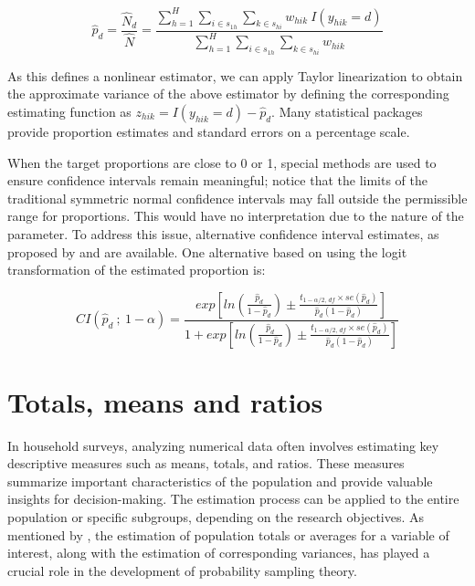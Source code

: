 \documentclass[
  12pt,
]{book}
\begin{document}
\[
\widehat{p}_d = \frac{\widehat{N}_d}{\widehat{N}} = \frac{\sum_{h=1}^{H}\sum_{i \in s_{1h}} \sum_{ k \in s_{hi}} w_{hik}\ I(y_{hik} = d)} {\sum_{h=1}^{H}\sum_{i \in s_{1h}} \sum_{ k \in s_{hi}} w_{hik}}
\]

As this defines a nonlinear estimator, we can apply Taylor linearization to obtain the approximate variance of the above estimator by defining the corresponding estimating function as \(z_{hik} = I(y_{hik} = d) - \widehat{p}_d\). Many statistical packages provide proportion estimates and standard errors on a percentage scale.

When the target proportions are close to 0 or 1, special methods are used to ensure confidence intervals remain meaningful; notice that the limits of the traditional symmetric normal confidence intervals may fall outside the permissible range for proportions. This would have no interpretation due to the nature of the parameter. To address this issue, alternative confidence interval estimates, as proposed by \citet{Rust2007ConfidenceIF} and \citet{DeanPagano2015} are available. One alternative based on using the logit transformation of the estimated proportion is:

\[
CI \left( \widehat{p}_d \ ; \ 1 - \alpha \right) = \frac {exp \left[ ln \left( \frac{\widehat{p}_d} {1 - \widehat{p}_d} \right) \pm \frac{t_{1-\alpha/2 , \, df} \times se \left( \widehat{p}_d \right)} {\widehat{p}_d \left( 1 - \widehat{p}_d \right) } \right]} {1 + exp \left[ ln \left( \frac{\widehat{p}_d} {1 - \widehat{p}_d} \right) \pm \frac{t_{1-\alpha/2, \, df} \times se \left( \widehat{p}_d \right)} {\widehat{p}_d \left( 1 - \widehat{p}_d \right)}\right]}
\]

\hypertarget{totals-means-and-ratios}{%
\section{Totals, means and ratios}\label{totals-means-and-ratios}}

In household surveys, analyzing numerical data often involves estimating key descriptive measures such as means, totals, and ratios. These measures summarize important characteristics of the population and provide valuable insights for decision-making. The estimation process can be applied to the entire population or specific subgroups, depending on the research objectives. As mentioned by \citet{Heeringa_West_Berglund_2017}, the estimation of population totals or averages for a variable of interest, along with the estimation of corresponding variances, has played a crucial role in the development of probability sampling theory.
\end{document}
